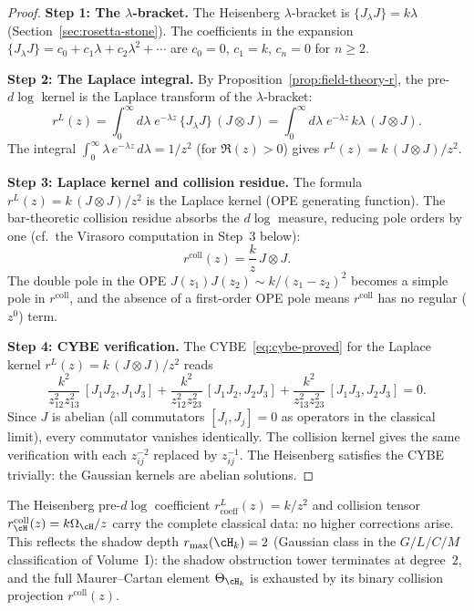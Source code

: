 \begin{proof}
\noindent\textbf{Step 1: The $\lambda$-bracket.}
The Heisenberg $\lambda$-bracket is
$\{J {}_\lambda J\} = k\lambda$
(Section~\ref{sec:rosetta-stone}). The coefficients in the
expansion $\{J {}_\lambda J\} = c_0 + c_1 \lambda + c_2 \lambda^2
+ \cdots$ are $c_0 = 0$, $c_1 = k$, $c_n = 0$ for $n \ge 2$.

\medskip
\noindent\textbf{Step 2: The Laplace integral.}
By Proposition~\ref{prop:field-theory-r}, the pre-\textup{\(d\log\)}
kernel is the Laplace transform of the $\lambda$-bracket:
\[
r^L(z) = \int_0^\infty d\lambda\; e^{-\lambda z}\,
\{J {}_\lambda J\}\, (J \otimes J)
= \int_0^\infty d\lambda\; e^{-\lambda z}\, k\lambda
\, (J \otimes J).
\]
The integral $\int_0^\infty \lambda\, e^{-\lambda z}\, d\lambda
= 1/z^2$ (for $\Re(z) > 0$) gives
$r^L(z) = k\, (J \otimes J)/z^2$.

\medskip
\noindent\textbf{Step 3: Laplace kernel and collision residue.}
The formula $r^L(z) = k\, (J \otimes J)/z^2$ is the Laplace
kernel (OPE generating function). The bar-theoretic collision
residue absorbs the $d\log$ measure, reducing pole orders by
one (cf.\ the Virasoro computation in Step~3 below):
\[
r^{\mathrm{coll}}(z) = \frac{k}{z}\, J \otimes J.
\]
The double pole in the OPE $J(z_1) J(z_2) \sim k/(z_1 - z_2)^2$
becomes a simple pole in $r^{\mathrm{coll}}$, and the absence
of a first-order OPE pole means $r^{\mathrm{coll}}$ has no
regular ($z^0$) term.

\medskip
\noindent\textbf{Step 4: CYBE verification.}
The CYBE~\eqref{eq:cybe-proved} for the Laplace kernel
$r^L(z) = k\, (J \otimes J)/z^2$
reads
\[
\frac{k^2}{z_{12}^2 z_{13}^2}\, [J_1 J_2, J_1 J_3]
+ \frac{k^2}{z_{12}^2 z_{23}^2}\, [J_1 J_2, J_2 J_3]
+ \frac{k^2}{z_{13}^2 z_{23}^2}\, [J_1 J_3, J_2 J_3] = 0.
\]
Since $J$ is abelian (all commutators $[J_i, J_j] = 0$ as
operators in the classical limit), every commutator vanishes
identically. The collision kernel gives the same verification with
each $z_{ij}^{-2}$ replaced by $z_{ij}^{-1}$. The Heisenberg satisfies
the CYBE trivially: the Gaussian kernels are abelian solutions.
\end{proof}

\begin{remark}
The Heisenberg pre-\(d\log\) coefficient $r^L_{\mathrm{coeff}}(z)=k/z^2$
and collision tensor $r^{\mathrm{coll}}_{\cH}(z)=k\Omega_{\cH}/z$
carry the complete classical data: no higher
corrections arise. This reflects the shadow depth
$r_{\max}(\cH_k) = 2$ (Gaussian class in the $G/L/C/M$
classification of Volume~I): the shadow obstruction tower terminates at degree~$2$,
and the full Maurer--Cartan element $\Theta_{\cH_k}$ is exhausted
by its binary collision projection $r^{\mathrm{coll}}(z)$.
\end{remark}

